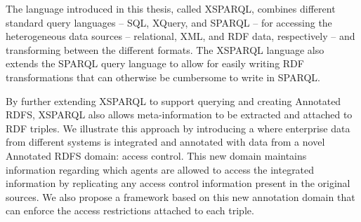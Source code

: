 The language introduced in this thesis, called XSPARQL, combines different standard query languages -- SQL, XQuery, and
SPARQL -- for accessing the heterogeneous data sources -- relational, XML, and RDF data, respectively -- and
transforming between the different formats.
%
The XSPARQL language also extends the SPARQL query language to allow for easily writing RDF transformations that can
otherwise be cumbersome to write in SPARQL.


By further extending XSPARQL to support querying and creating Annotated RDFS, XSPARQL also allows meta-information to be
extracted and attached to RDF triples.
%
We illustrate this approach by introducing a \usecase where enterprise data from different systems is integrated and
annotated with data from a novel Annotated RDFS domain: access control.  
%
This new domain maintains information regarding which agents are allowed to access the integrated information by
replicating any access control information present in the original sources.
%
We also propose a framework based on this new annotation domain that can enforce the access restrictions attached to
each triple.

